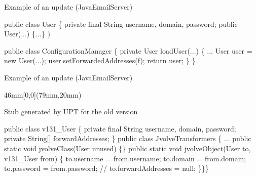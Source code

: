 \begin{frame}[fragile,shrink=5]{Example of an update (JavaEmailServer)}%
\begin{\ExampleCodeSize}
\begin{semiverbatim}
  public class User \{
    private final String username, domain, password;
    public User(...) \{...\}
  \}

  public class ConfigurationManager \{
    private User loadUser(...) \{
       ...
       User user = new User(...);
       user.setForwardedAddresses(f);
       return user;
    \}
  \}
\end{semiverbatim}
\end{\ExampleCodeSize}
\end{frame}

\begin{frame}[fragile,shrink=5]{Example of an update (JavaEmailServer)}%
 {
\begin{textblock*}{46mm}[0,0](79mm,20mm)
\begin{block}{}
Stub generated by UPT for the old version
\end{block}
\end{textblock*}
}
\begin{small}
\begin{semiverbatim}
public class v131_User \{
  private final String username, domain, password;
  private String[] forwardAddresses;
\}
public class JvolveTransformers \{
 ...
 public static void jvolveClass(User unused) \{\}
 public static void jvolveObject(User to, v131_User from) \{
    to.username = from.username;
    to.domain = from.domain;
    to.password = from.password;
    // to.forwardAddresses = null;
    \}\}\}

\end{semiverbatim}
\end{small}
\end{frame}

